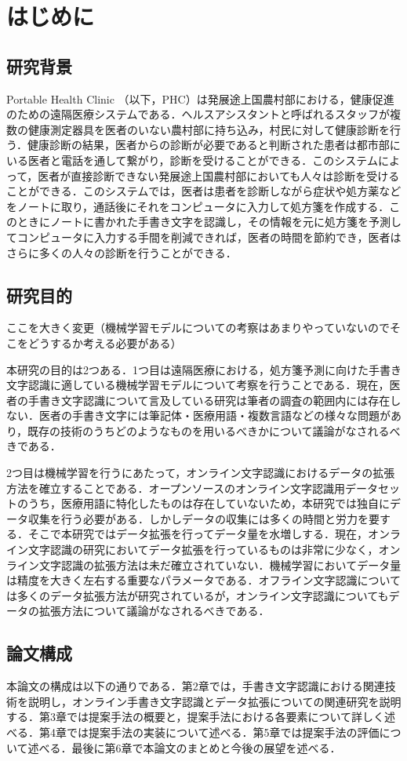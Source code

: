 
\chapter{はじめに}
\label{cha:intro}
\section{研究背景}
\label{sec:background}
Portable Health Clinic （以下，PHC）は発展途上国農村部における，健康促進のための遠隔医療システムである\cite{ahmed15:portable}．ヘルスアシスタントと呼ばれるスタッフが複数の健康測定器具を医者のいない農村部に持ち込み，村民に対して健康診断を行う．健康診断の結果，医者からの診断が必要であると判断された患者は都市部にいる医者と電話を通して繋がり，診断を受けることができる．このシステムによって，医者が直接診断できない発展途上国農村部においても人々は診断を受けることができる．このシステムでは，医者は患者を診断しながら症状や処方薬などをノートに取り，通話後にそれをコンピュータに入力して処方箋を作成する．このときにノートに書かれた手書き文字を認識し，その情報を元に処方箋を予測してコンピュータに入力する手間を削減できれば，医者の時間を節約でき，医者はさらに多くの人々の診断を行うことができる．

\section{研究目的}
ここを大きく変更（機械学習モデルについての考察はあまりやっていないのでそこをどうするか考える必要がある）

本研究の目的は2つある．1つ目は遠隔医療における，処方箋予測に向けた手書き文字認識に適している機械学習モデルについて考察を行うことである．現在，医者の手書き文字認識について言及している研究は筆者の調査の範囲内には存在しない．医者の手書き文字には筆記体・医療用語・複数言語などの様々な問題があり，既存の技術のうちどのようなものを用いるべきかについて議論がなされるべきである．

2つ目は機械学習を行うにあたって，オンライン文字認識におけるデータの拡張方法を確立することである．オープンソースのオンライン文字認識用データセットのうち，医療用語に特化したものは存在していないため，本研究では独自にデータ収集を行う必要がある．しかしデータの収集には多くの時間と労力を要する．そこで本研究ではデータ拡張を行ってデータ量を水増しする．現在，オンライン文字認識の研究においてデータ拡張を行っているものは非常に少なく，オンライン文字認識の拡張方法は未だ確立されていない．機械学習においてデータ量は精度を大きく左右する重要なパラメータである．オフライン文字認識については多くのデータ拡張方法が研究されているが，オンライン文字認識についてもデータの拡張方法について議論がなされるべきである．

\section{論文構成}
本論文の構成は以下の通りである．第2章では，手書き文字認識における関連技術を説明し，オンライン手書き文字認識とデータ拡張についての関連研究を説明する．第3章では提案手法の概要と，提案手法における各要素について詳しく述べる．第4章では提案手法の実装について述べる．第5章では提案手法の評価について述べる．最後に第6章で本論文のまとめと今後の展望を述べる．
